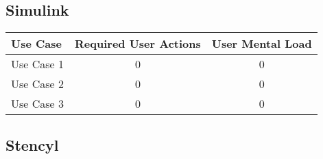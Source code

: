 \subsection*{Simulink}




\begin{tabularx}{\textwidth}{Xcc}
\textbf{Use Case} & \textbf{Required User Actions} & \textbf{User Mental Load}\\
\hline
Use Case 1                          & {\color{red}0} & {\color{red}0} \\
Use Case 2                          & {\color{red}0} & {\color{red}0} \\
Use Case 3                          & {\color{red}0} & {\color{red}0}
\end{tabularx}

\subsection*{Stencyl}




